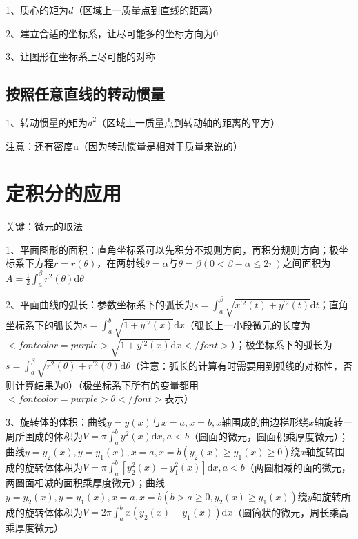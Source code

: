 1、质心的矩为$ d $（区域上一质量点到直线的距离）

2、建立合适的坐标系，让尽可能多的坐标方向为0

3、让图形在坐标系上尽可能的对称



\subsection{按照任意直线的转动惯量}

1、转动惯量的矩为$ d^2 $（区域上一质量点到转动轴的距离的平方）

注意：还有密度u（因为转动惯量是相对于质量来说的）



\section{定积分的应用}

关键：微元的取法

1、平面图形的面积：直角坐标系可以先积分不规则方向，再积分规则方向；极坐标系下方程$ r=r(\theta) $，在两射线$ \theta=\alpha $与$ \theta=\beta(0<\beta-\alpha \leqslant 2 \pi) $之间面积为$ A=\frac{1}{2} \int_{a}^{\beta} r^{2}(\theta) \mathrm{d} \theta $

2、平面曲线的弧长：参数坐标系下的弧长为$ s=\int_{a}^{\beta} \sqrt{x^{\prime 2}(t)+y^{\prime 2}(t)} \mathrm{d} t $；直角坐标系下的弧长为$ s=\int_{a}^{b} \sqrt{1+y^{\prime 2}(x)} \mathrm{d} x $（弧长上一小段微元的长度为$ <font color=purple>\sqrt{1+y^{\prime 2}(x)} \mathrm{d} x</font> $）；极坐标系下的弧长为$ s=\int_{a}^{\beta} \sqrt{r^{2}(\theta)+r^{\prime 2}(\theta)} \mathrm{d} \theta $（注意：弧长的计算有时需要用到弧线的对称性，否则计算结果为0）（极坐标系下所有的变量都用$ <font color=purple>\theta</font> $表示）

3、旋转体的体积：曲线$ y=y(x) $与$ x=a, x=b, x $轴围成的曲边梯形绕$ x $轴旋转一周所围成的体积为$ V=\pi \int_{a}^{b} y^{2}(x) \mathrm{d} x, a<b $（圆面的微元，圆面积乘厚度微元）；曲线$ y=y_{2}(x), y=y_{1}(x), x=a, x=b\left(y_{2}(x) \geqslant y_{1}(x) \geqslant 0\right) $绕$ x $轴旋转围成的旋转体体积为$ V=\pi \int_{a}^{b}\left[y_{2}^{2}(x)-y_{1}^{2}(x)\right] \mathrm{d} x, a<b $（两圆相减的面的微元，两圆面相减的面积乘厚度微元）；曲线$ y=y_{2}(x), y=y_{1}(x), x=a, x=b\left(b>a \geqslant 0, y_{2}(x) \geqslant y_{1}(x)\right) $绕$ y $轴旋转所成的旋转体体积为$ V=2 \pi \int_{a}^{b} x\left(y_{2}(x)-y_{1}(x)\right) \mathrm{d} x $（圆筒状的微元，周长乘高乘厚度微元）

